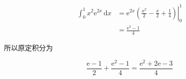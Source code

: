 \begin{answer}
\nopagebreak[4]
\[
\begin{aligned}
\int_0^1x^2\mathrm e^{2x}\,\mathrm dx
&=\left.\mathrm e^{2x}\left(\frac{x^2}{2}-\frac{x}{2}+\frac14\right)\right|_0^1\\
&=\frac{\mathrm e^2-1}{4}
\end{aligned}
\]

所以原定积分为

\nopagebreak[4]
\[
\frac{\mathrm e-1}{2}+\frac{\mathrm e^2-1}{4}
=\frac{\mathrm e^2+2\mathrm e-3}{4}
\]


\end{answer}
